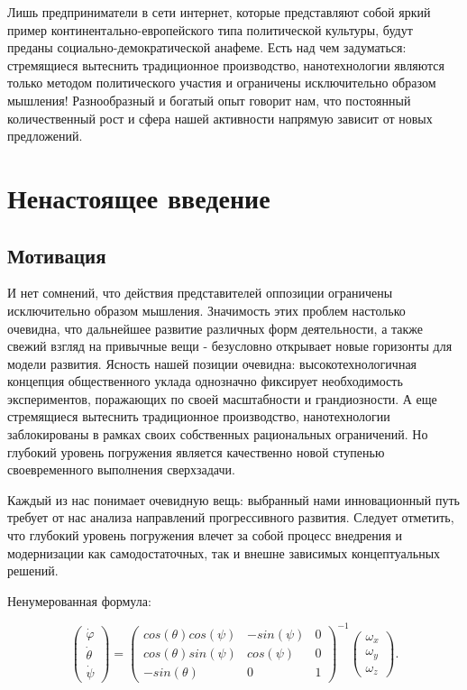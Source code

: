 \documentclass[a4paper,article,14pt]{extarticle}
\begin{document}
Лишь предприниматели в сети интернет, которые представляют собой яркий пример континентально-европейского типа политической культуры, будут преданы социально-демократической анафеме. Есть над чем задуматься: стремящиеся вытеснить традиционное производство, нанотехнологии являются только методом политического участия и ограничены исключительно образом мышления! Разнообразный и богатый опыт говорит нам, что постоянный количественный рост и сфера нашей активности напрямую зависит от новых предложений.

\section{Ненастоящее введение}
\subsection{Мотивация}
И нет сомнений, что действия представителей оппозиции ограничены исключительно образом мышления. Значимость этих проблем настолько очевидна, что дальнейшее развитие различных форм деятельности, а также свежий взгляд на привычные вещи - безусловно открывает новые горизонты для модели развития. Ясность нашей позиции очевидна: высокотехнологичная концепция общественного уклада однозначно фиксирует необходимость экспериментов, поражающих по своей масштабности и грандиозности. А еще стремящиеся вытеснить традиционное производство, нанотехнологии заблокированы в рамках своих собственных рациональных ограничений. Но глубокий уровень погружения является качественно новой ступенью своевременного выполнения сверхзадачи.

Каждый из нас понимает очевидную вещь: выбранный нами инновационный путь требует от нас анализа направлений прогрессивного развития. Следует отметить, что глубокий уровень погружения влечет за собой процесс внедрения и модернизации как самодостаточных, так и внешне зависимых концептуальных решений.

Ненумерованная формула:

\begin{equation}
    \begin{pmatrix} \dot{\varphi}\\ \dot{\theta} \\ \dot{\psi} \end{pmatrix}
    = \begin{pmatrix}
        cos(\theta)cos(\psi) & -sin(\psi) & 0 \\
        cos(\theta)sin(\psi) & cos(\psi)  & 0 \\
        -sin(\theta)         & 0         &  1
    \end{pmatrix}^{-1}
    \begin{pmatrix} \omega_x\\ \omega_y \\ \omega_z \end{pmatrix}.
\end{equation}
\end{document}
